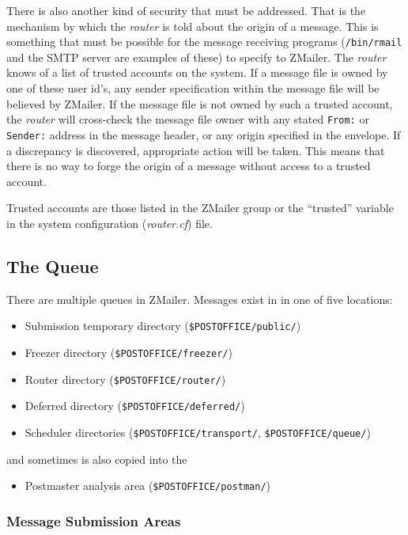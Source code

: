 There is also another kind of security that must be addressed.  That is the
mechanism by which the {\em router\/} is told about the origin of a message.  This
is something that must be possible for the message receiving programs
({\tt /bin/rmail} and the SMTP server are examples of these) to specify to
ZMailer.  The {\em router\/} knows of a list of trusted accounts on the system.  If
a message file is owned by one of these user id's, any sender specification
within the message file will be believed by ZMailer.  If the message file
is not owned by such a trusted account, the {\em router\/} will cross-check the
message file owner with any stated {\tt From:} or {\tt Sender:} address 
in the message header, or any origin specified in the envelope.  If a 
discrepancy is discovered, appropriate action will be taken.  This means 
that there is no way to forge the origin of a message without access to a 
trusted account.

Trusted accounts are those listed in the ZMailer group or the ``trusted'' 
variable in the system configuration ({\em router.cf\/}) file.




\subsection{The Queue}

There are multiple queues in ZMailer. Messages exist in
in one of five locations:

\begin{itemize}
\item Submission temporary directory ({\tt \$POSTOFFICE/public/})
\item Freezer directory ({\tt \$POSTOFFICE/freezer/})
\item Router directory ({\tt \$POSTOFFICE/router/})
\item Deferred directory ({\tt \$POSTOFFICE/deferred/})
\item Scheduler directories ({\tt \$POSTOFFICE/transport/}, 
{\tt \$POSTOFFICE/queue/})
\end{itemize}

and sometimes is also copied into the 
\begin{itemize}
\item Postmaster analysis area ({\tt \$POSTOFFICE/postman/})
\end{itemize}





\subsubsection{Message Submission Areas}



